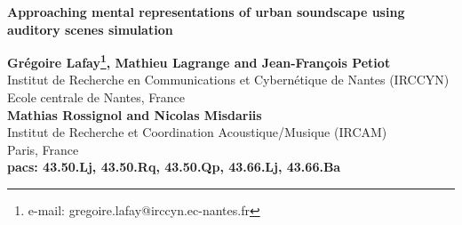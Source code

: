 \documentclass[12pt, titlepage, reqno]{article} %
\renewcommand{\baselinestretch}{2}
\begin{document}
\begin{titlepage}

 \begin{center}

 \textbf{Approaching mental representations of urban soundscape using auditory scenes simulation}\\
 
 
 
 \vspace{10ex}

\textbf{Gr\'egoire Lafay\footnote{e-mail: gregoire.lafay@irccyn.ec-nantes.fr}, Mathieu Lagrange and Jean-Fran\c cois Petiot}\\

Institut de Recherche en Communications et  Cybernétique de Nantes (IRCCYN) \\

Ecole centrale de Nantes, France \\

\textbf{Mathias Rossignol and Nicolas Misdariis }\\

Institut de Recherche et Coordination Acoustique/Musique (IRCAM) \\ 

Paris, France \\

\textbf{pacs: 43.50.Lj, 43.50.Rq, 43.50.Qp, 43.66.Lj, 43.66.Ba}
 \end{center}

 \end{titlepage}




%




\end{document}
